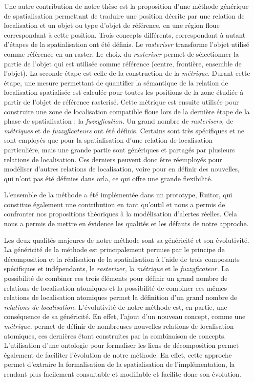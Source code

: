 Une autre contribution de notre thèse est la proposition d'une méthode
générique de spatialisation permettant de traduire une position
décrite par une relation de localisation et un objet ou type d'objet
de référence, en une région floue correspondant à cette position.
Trois concepts différents, correspondant à autant d'étapes de la
spatialisation ont été définis. Le \emph{rasteriser} transforme
l'objet utilisé comme référence en un raster. Le choix du
\emph{rasteriser} permet de sélectionner la partie de l'objet qui est
utilisée comme référence (centre, frontière, ensemble de l'objet). La
seconde étape est celle de la construction de la
\emph{métrique}. Durant cette étape, une mesure permettant de
quantifier la sémantique de la relation de localisation spatialisée
est calculée pour toutes les positions de la zone étudiée à partir de
l'objet de référence rasterisé. Cette métrique est ensuite utilisée
pour construire une zone de localisation compatible floue lors de la
dernière étape de la phase de spatialisation : la
\emph{fuzzyfication.}  Un grand nombre de \emph{rasterisers,} de
\emph{métriques} et de \emph{fuzzyficateurs} ont été définis. Certains
sont très spécifiques et ne sont employés que pour la spatialisation
d'une relation de localisation particulière, mais une grande partie
sont génériques et partagés par plusieurs relations de
localisation. Ces derniers peuvent donc être réemployés pour modéliser
d'autres relations de localisation, voire pour en définir des
nouvelles, qui n'ont pas été définies dans \ac{orla}, ce qui offre une
grande flexibilité.

L'ensemble de la méthode a été implémentée dans un prototype, Ruitor,
qui constitue également une contribution en tant qu'outil et nous a
permis de confronter nos propositions théoriques à la modélisation
d'alertes réelles. Cela nous a permis de mettre en évidence les
qualités et les défauts de notre approche.

Les deux qualités majeures de notre méthode sont sa généricité et son
évolutivité. La généricité de la méthode est principalement permise
par le principe de décomposition et la réalisation de la
spatialisation à l'aide de trois composants spécifiques et
indépendants, le \emph{rasterizer,} la \emph{métrique} et le
\emph{fuzzyficateur.} La possibilité de combiner ces trois éléments
pour définir un grand nombre de relations de localisation atomiques et
la possibilité de combiner ces mêmes relations de localisation
atomiques permet la définition d'un grand nombre de \emph{relations de
  localisation.} L'évolutivité de notre méthode est, en partie, une
conséquence de sa généricité. En effet, l'ajout d'un nouveau concept,
comme une \emph{métrique,} permet de définir de nombreuses nouvelles
relations de localisation atomiques, ces dernières étant construites
par la combinaison de concepts. L'utilisation d'une ontologie pour
formaliser les liens de décomposition permet également de faciliter
l'évolution de notre méthode. En effet, cette approche permet
d'extraire la formalisation de la spatialisation de l'implémentation,
la rendant plus facilement consultable et modifiable et facilite donc
son évolution.

